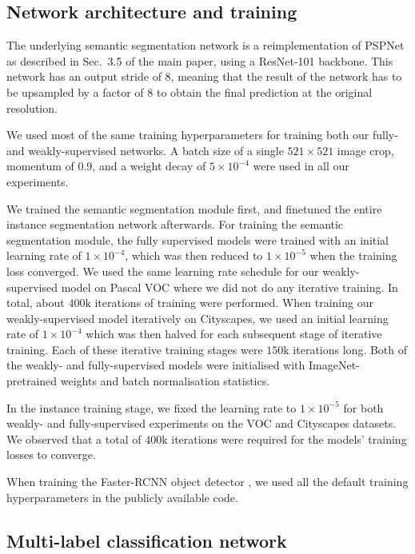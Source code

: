 \documentclass[runningheads]{llncs}
\begin{document}
\subsection{Network architecture and training}
The underlying semantic segmentation network is a reimplementation of PSPNet \cite{zhao_cvpr_2017} as described in Sec.~3.5 of the main paper, using a ResNet-101 backbone.
This network has an output stride of 8, meaning that the result of the network has to be upsampled by a factor of 8 to obtain the final prediction at the original resolution.

We used most of the same training hyperparameters for training both our fully- and weakly-supervised networks.
A batch size of a single $521 \times 521$ image crop, momentum of $0.9$, and a weight decay of $5 \times 10^{-4}$ were used in all our experiments.

We trained the semantic segmentation module first, and finetuned the entire instance segmentation network afterwards.
For training the semantic segmentation module, the fully supervised models were trained with an initial learning rate of $1 \times 10^{-4}$, which was then reduced to $1 \times 10^{-5}$ when the training loss converged.
We used the same learning rate schedule for our weakly-supervised model on Pascal VOC where we did not do any iterative training.
In total, about $400\text{k}$ iterations of training were performed.
When training our weakly-supervised model iteratively on Cityscapes, we used an initial learning rate of $1 \times 10^{-4}$ which was then halved for each subsequent stage of iterative training.
Each of these iterative training stages were $150\text{k}$ iterations long.
Both of the weakly- and fully-supervised models were initialised with ImageNet-pretrained weights and batch normalisation statistics.

In the instance training stage, we fixed the learning rate to $1\times 10^{-5}$ for both weakly- and fully-supervised experiments on the VOC and Cityscapes datasets. 
We observed that a total of $400 \text{k}$ iterations were required for the models' training losses to converge.

When training the Faster-RCNN object detector \cite{ren_2015}, we used all the default training hyperparameters in the publicly available code.

\subsection{Multi-label classification network}
\label{sec:multilabel_training}
\end{document}
